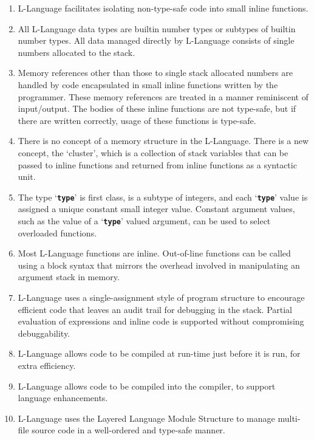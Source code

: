 \documentclass[12pt]{article}
\newcommand{\TT}[1]{{\tt \bfseries #1}}
\begin{document}
\begin{enumerate}

\item
L-Language facilitates isolating non-type-safe code into small inline functions.

\item
All L-Language data types are builtin number types or subtypes of
builtin number types.  All data managed directly by L-Language consists
of single numbers allocated to the stack.

\item
Memory references other than those to single stack allocated numbers
are handled by code
encapsulated in small inline functions written by the programmer.
These memory references
are treated in a manner reminiscent of input/output.
The bodies of these inline functions are not type-safe, but if
there are written correctly, usage of these functions is type-safe.

\item
There is no concept of a memory structure in the L-Language.  There
is a new concept, the `cluster', which is a collection of stack
variables that can be passed to inline functions
and returned from inline functions as a syntactic unit.

\item
The type `\TT{type}' is first class, is a subtype of integers, and
each `\TT{type}' value is assigned
a unique constant small integer value.  Constant
argument values, such as the value of a `\TT{type}' valued
argument, can be used to select overloaded functions.

\item
Most L-Language functions are inline.  Out-of-line functions can be
called using a block syntax that mirrors the overhead involved in
manipulating an argument stack in memory.

\item
L-Language uses a single-assignment style of program structure
to encourage
efficient code that leaves an audit trail for debugging in the stack.
Partial evaluation of expressions and inline code is supported without
compromising debuggability.

\item
L-Language allows code to be compiled at run-time just before
it is run, for extra efficiency.

\item
L-Language allows code to be compiled into the compiler, to support
language enhancements.

\item
L-Language uses the Layered Language Module Structure to manage
multi-file source code in a well-ordered and type-safe manner.


\end{enumerate}
\end{document}
